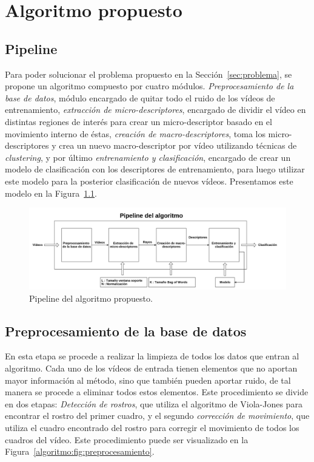 \chapter[Algoritmo propuesto]{Algoritmo propuesto}
\label{ch:algoritmo}
\section{Pipeline}
\label{sec:pipeline}
Para poder solucionar el problema propuesto en la Sección~\ref{sec:problema}, se propone un algoritmo compuesto por cuatro módulos. \emph{Preprocesamiento de la base de datos}, módulo encargado de quitar todo el ruido de los vídeos de entrenamiento, \emph{extracción de micro-descriptores}, encargado de dividir el vídeo en distintas regiones de interés para crear un micro-descriptor basado en el movimiento interno de éstas, \emph{creación de macro-descriptores}, toma los micro-descriptores y crea un nuevo macro-descriptor por vídeo utilizando técnicas de \textit{clustering}, y por último \emph{entrenamiento y clasificación}, encargado de crear un modelo de clasificación con los descriptores de entrenamiento, para luego utilizar este modelo para la posterior clasificación de nuevos vídeos. Presentamos este modelo en la Figura~\ref{algoritmo:fig:pipeline}.

	\begin{figure}[bt]
		\centering
    		\includegraphics[width=1\textwidth]{Figuras/Diagramas/pipeline.png}
  		\caption{Pipeline del algoritmo propuesto.}
  		\label{algoritmo:fig:pipeline}
	\end{figure}	


\section{Preprocesamiento de la base de datos}
\label{sec:proc_bdd}
	En esta etapa se procede a realizar la limpieza de todos los datos que entran al algoritmo. Cada uno de los vídeos de entrada tienen elementos que no aportan mayor información al método, sino que también pueden aportar ruido, de tal manera se procede a eliminar todos estos elementos. Este procedimiento se divide en dos etapas: \emph{Detección de rostros}, que utiliza el algoritmo de Viola-Jones para encontrar el rostro del primer cuadro, y el segundo \emph{corrección de movimiento}, que utiliza el cuadro encontrado del rostro para corregir el movimiento de todos los cuadros del vídeo. Este procedimiento puede ser visualizado en la Figura~\ref{algoritmo:fig:preprocesamiento}. 
	
